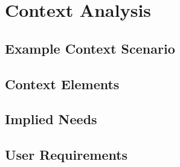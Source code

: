 \chapter{Context Analysis}
\label{app:context_analysis}

\section{Example Context Scenario}
\label{app:context_scenario}


\section{Context Elements}
\label{app:context_elements}


\section{Implied Needs}
\label{app:implied_needs}


\section{User Requirements}
\label{app:user_requirements}


